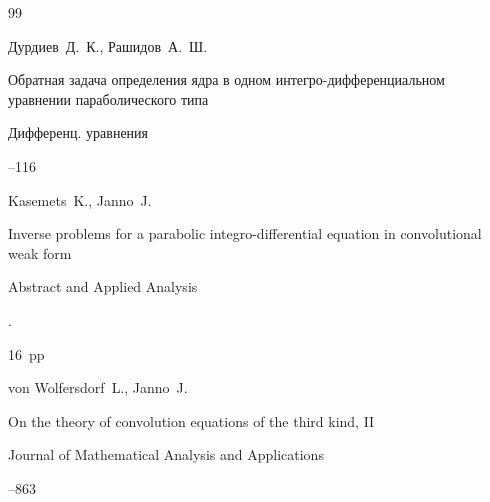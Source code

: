 \begin{thebibliography}{99}




\by  Дурдиев~Д.~К., Рашидов~А.~Ш. 

\paper Обратная задача определения ядра в одном интегро-дифференциальном уравнении  параболического типа

\jour Дифференц. уравнения




--116










\by Kasemets~K., Janno~J. 

\paper Inverse problems for a parabolic integro-differential equation in convolutional weak form

\jour Abstract and Applied Analysis



.


16~pp 









\by von Wolfersdorf~L., Janno~J. 

\paper On the theory of convolution equations of the third kind, II


\jour Journal of Mathematical Analysis and Applications




--863






\end{thebibliography}
